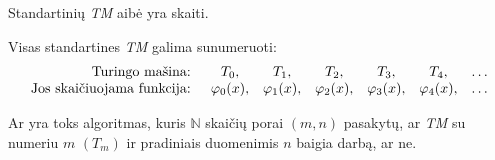 \begin{prop}
  Standartinių \emph{TM} aibė yra skaiti.
  \begin{note}
    Visas standartines \emph{TM} galima sunumeruoti:
    \[
    \begin{array}{r c c c c c l}
     \text{Turingo mašina: } & T_0, & T_1, & T_2, & T_3, & T_4, & \dotsc \\
     \text{Jos skaičiuojama funkcija: } & \varphi_0(x), & \varphi_1(x), &%
       \varphi_2(x), & \varphi_3(x), & \varphi_4(x), & \dotsc
      
    \end{array}
    \]
  \end{note}
\end{prop}

\begin{defn}
  Ar yra toks algoritmas, kuris $\mathbb{N}$ skaičių porai $(m,n)$ 
  pasakytų, ar \emph{TM} su numeriu $m$ $(T_m)$ ir pradiniais
  duomenimis $n$ baigia darbą, ar ne.
\end{defn}

